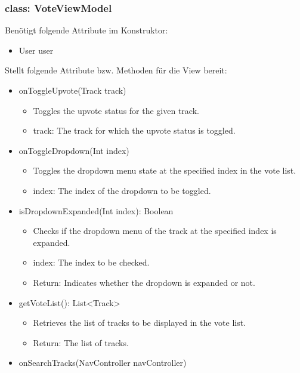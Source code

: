 \documentclass[oneside, ngerman]{sdqtechreport}
\begin{document}
\subsubsection{class: VoteViewModel}

Benötigt folgende Attribute im Konstruktor:
\begin{itemize}
    \item User user
\end{itemize}
Stellt folgende Attribute bzw. Methoden für die View bereit:
\begin{itemize}

    \item onToggleUpvote(Track track)
        \begin{itemize}
            \item Toggles the upvote status for the given track.
            \item track: The track for which the upvote status is toggled.
        \end{itemize}
    \item onToggleDropdown(Int index)
        \begin{itemize}
            \item Toggles the dropdown menu state at the specified index in the vote list.
            \item index: The index of the dropdown to be toggled.
        \end{itemize}
    \item isDropdownExpanded(Int index): Boolean
        \begin{itemize}
            \item Checks if the dropdown menu of the track at the specified index is expanded.
            \item index: The index to be checked.
            \item Return: Indicates whether the dropdown is expanded or not.
        \end{itemize}
    \item getVoteList(): List<Track>
        \begin{itemize}
            \item Retrieves the list of tracks to be displayed in the vote list.
            \item Return: The list of tracks.
        \end{itemize}
    \item onSearchTracks(NavController navController)
        \begin{itemize}

\end{itemize}
\end{itemize}
\end{document}
